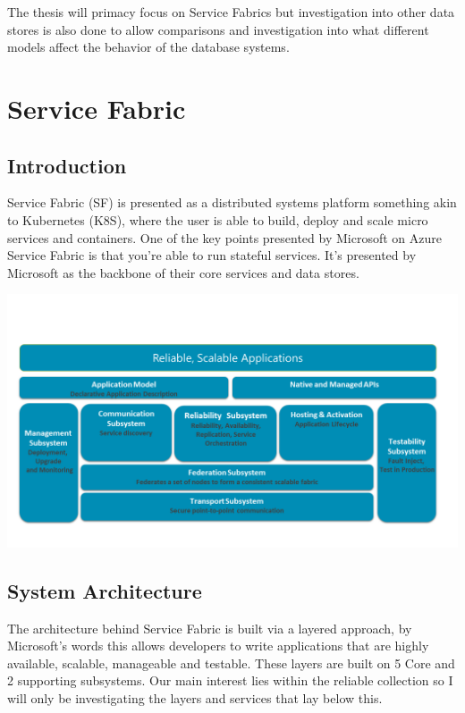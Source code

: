 \documentclass[a4paper,10pt,titlepage]{report}
\begin{document}
    The thesis will primacy focus on Service Fabrics but investigation into other data stores is also done to allow comparisons and investigation into what different models affect the behavior of the database systems.


    \section{Service Fabric}

%

    \subsection{Introduction}

    Service Fabric (SF) is presented as a distributed systems platform something akin to Kubernetes (K8S), where the user is able to build, deploy and scale micro services and containers. One of the key points presented by Microsoft on Azure Service Fabric is that you're able to run stateful services. It's presented by Microsoft as the backbone of their core services and data stores.\\
    \vspace{5mm}

    \includegraphics[scale=0.5]{images/service-fabric-architecture.png}

    \subsection{System Architecture}

    The architecture behind Service Fabric is built via a layered approach, by Microsoft's words this allows developers to write applications that are highly available, scalable, manageable and testable. These layers are built on 5 Core and 2 supporting subsystems. Our main interest lies within the reliable collection so I will only be investigating the layers and services that lay below this.\\
    \vspace{5mm}
\end{document}
